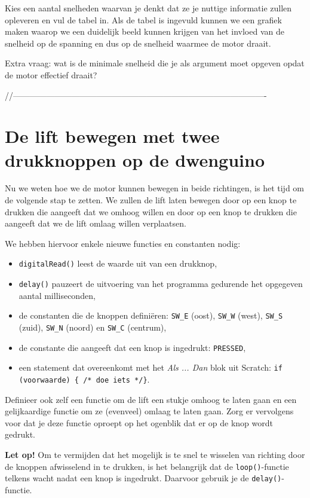 \documentclass[a4paper, 10pt]{article}
\begin{document}
Kies een aantal snelheden waarvan je denkt dat ze je nuttige informatie zullen opleveren en vul de tabel in. Als de tabel
is ingevuld kunnen we een grafiek maken waarop we een duidelijk beeld kunnen krijgen van het invloed van de snelheid op
de spanning en dus op de snelheid waarmee de motor draait.

Extra vraag: wat is de minimale snelheid die je als argument moet opgeven opdat de motor effectief draait?


//-------------------------------------------------------------------------------------------
\section{De lift bewegen met twee drukknoppen op de dwenguino}

Nu we weten hoe we de motor kunnen bewegen in beide richtingen, is het tijd om de volgende stap te zetten. We zullen
de lift laten bewegen door op een knop te drukken die aangeeft dat we omhoog willen en door op een knop te drukken
die aangeeft dat we de lift omlaag willen verplaatsen.

We hebben hiervoor enkele nieuwe functies en constanten nodig:

\begin{itemize}
\item \texttt{digitalRead()} leest de waarde uit van een drukknop,
\item \texttt{delay()} pauzeert de uitvoering van het programma gedurende het opgegeven aantal milliseconden,
\item de constanten die de knoppen defini\"eren: \texttt{SW\_E} (oost), \texttt{SW\_W} (west), \texttt{SW\_S} (zuid), \texttt{SW\_N} (noord) en \texttt{SW\_C} (centrum),
\item de constante die aangeeft dat een knop is ingedrukt: \texttt{PRESSED},
\item een statement dat overeenkomt met het {\em Als ... Dan} blok uit Scratch: \texttt{if (voorwaarde) \{ /* doe iets */\}}.
\end{itemize}

Definieer ook zelf een functie om de lift een stukje omhoog te laten gaan en een gelijkaardige functie om ze (evenveel)
omlaag te laten gaan. Zorg er vervolgens voor dat je deze functie oproept op het ogenblik dat er op de knop wordt
gedrukt.

\textbf{Let op!} Om te vermijden dat het mogelijk is te snel te wisselen van richting door de knoppen afwisselend in te
drukken, is het belangrijk dat de \texttt{loop()}-functie telkens wacht nadat een knop is ingedrukt. Daarvoor gebruik je
de \texttt{delay()}-functie.
\end{document}
